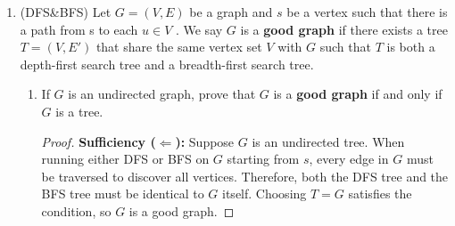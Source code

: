 \documentclass[12pt,a4paper]{article}
\theoremstyle{definition}
\begin{document}
\begin{enumerate}
\begin{enumerate}
        In this situation, the merging steps require:
        \[
        (1 + 1) + (2 + 2) + (4 + 4) + \ldots + (2^{k-1} + 2^{k-1}) = \sum_{j=0}^{k-1} 2^{j+1} = 2^{k+1} - 2
        \]
        operations. Since $n = 2^k - 1$, the total number of operations is $2n$, which gives a worst-case time complexity of 
        \[
        \boxed{O(n)}
        \]
    
        \textbf{Amortized Analysis (Aggregate Method)}
        
        Consider how frequently each array $A_i$ is involved in a merge or copy operation during $n$ insertions:
        \begin{itemize}
            \item Array $A_0$ (size $2^0$) is involved in every insertion, which happens $n$ times.
            \item Array $A_1$ (size $2^1$) is involved in every $2$ insertions, which happens $\lfloor n/2 \rfloor$ times.
            \item In general, array $A_i$ (size $2^i$) is involved every $2^i$ insertions, which happens $\lfloor n/2^i \rfloor$ times.
        \end{itemize}
        Thus, the total cost for $n$ insertions is:
        \[
        \sum_{i=0}^{\lfloor \log_2 n \rfloor} \lfloor \frac{n}{2^i} \rfloor \cdot 2^i \leq \sum_{i=0}^{\lfloor \log_2 n \rfloor} \frac{n}{2^i} \cdot 2^i = n \sum_{i=0}^{\lfloor \log_2 n \rfloor} 1 = O(n \log n)
        \]
        The amortized cost per insertion, is:
        \[
        \frac{O(n \log n)}{n} = \boxed{O(\log n)}
        \]
    \end{enumerate}

   \item {\color{purple}(DFS\&BFS)} Let $G = (V, E)$ be a graph and $s$ be a vertex such that there is a path from s to each $u \in V$ . We say $G$ is a \textbf{good graph} if there exists a tree $T = (V, E′)$ that share the same vertex set $V$ with $G$ such that $T$ is both a depth-first search tree and a breadth-first  search tree.
    \begin{enumerate}
        \item If $G$ is an undirected graph, prove that $G$ is a \textbf{good graph} if and only if $G$ is a tree.

        \begin{proof}
        
        \textbf{Sufficiency ($\Leftarrow$):} Suppose $G$ is an undirected tree. When running either DFS or BFS on $G$ starting from $s$, every edge in $G$ must be traversed to discover all vertices. Therefore, both the DFS tree and the BFS tree must be identical to $G$ itself. Choosing $T = G$ satisfies the condition, so $G$ is a good graph.
        

\end{proof}
\end{enumerate}
\end{enumerate}
\end{document}
